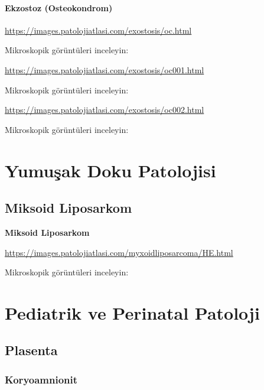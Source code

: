 \documentclass[
  letterpaper,
  DIV=11,
  numbers=noendperiod]{scrreprt}
\begin{document}
\hypertarget{ekzostoz-osteokondrom}{%
\subsection{Ekzostoz (Osteokondrom)}\label{ekzostoz-osteokondrom}}

\url{https://images.patolojiatlasi.com/exostosis/oc.html}

Mikroskopik görüntüleri inceleyin:

\url{https://images.patolojiatlasi.com/exostosis/oc001.html}

Mikroskopik görüntüleri inceleyin:

\url{https://images.patolojiatlasi.com/exostosis/oc002.html}

Mikroskopik görüntüleri inceleyin:

\hypertarget{section-1}{%
\subsection{}\label{section-1}}

\part{Yumuşak Doku Patolojisi}

\hypertarget{miksoid-liposarkom}{%
\chapter{Miksoid Liposarkom}\label{miksoid-liposarkom}}

\textbf{Miksoid Liposarkom}

\url{https://images.patolojiatlasi.com/myxoidliposarcoma/HE.html}

Mikroskopik görüntüleri inceleyin:

\part{Pediatrik ve Perinatal Patoloji}

\hypertarget{plasenta}{%
\chapter{Plasenta}\label{plasenta}}

\hypertarget{koryoamnionit}{%
\section{Koryoamnionit}\label{koryoamnionit}}
\end{document}
